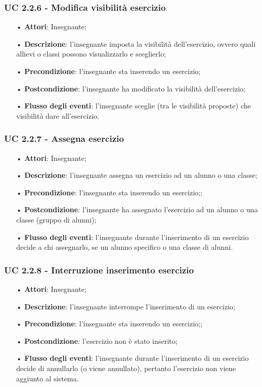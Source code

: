 \subsubsection{UC 2.2.6 - Modifica visibilità esercizio}
\begin{itemize}
	\item[•] \textbf{Attori}: Insegnante;
	\item[•] \textbf{Descrizione}: l'insegnante imposta la visibilità dell'esercizio, ovvero quali allievi o classi possono visualizzarlo e sceglierlo;
	\item[•] \textbf{Precondizione}: l'insegnante sta inserendo un esercizio;
	\item[•] \textbf{Postcondizione}: l'insegnante ha modificato la visibilità dell'esercizio;
	\item[•] \textbf{Flusso degli eventi}: l'insegnante sceglie (tra le visibilità proposte) che visibilità dare all'esercizio.
\end{itemize}


\subsubsection{UC 2.2.7 - Assegna esercizio} 
\begin{itemize}
	\item[•] \textbf{Attori}: Insegnante;
	\item[•] \textbf{Descrizione}: l'insegnante assegna un esercizio ad un alunno o una classe;
	\item[•] \textbf{Precondizione}: l'insegnante sta inserendo un esercizio;;
	\item[•] \textbf{Postcondizione}: l'insegnante ha assegnato l'esercizio ad un alunno o una classe (gruppo di alunni);
	\item[•] \textbf{Flusso degli eventi}: l'insegnante durante l'inserimento di un esercizio decide a chi assegnarlo, se un alunno specifico o una classe di alunni.
\end{itemize}

\subsubsection{UC 2.2.8 - Interruzione inserimento esercizio}
\begin{itemize}
	\item[•] \textbf{Attori}: Insegnante;
	\item[•] \textbf{Descrizione}: l'insegnante interrompe l'inserimento di un esercizio;
	\item[•] \textbf{Precondizione}: l'insegnante sta inserendo un esercizio;;
	\item[•] \textbf{Postcondizione}: l'esercizio non è stato inserito;
	\item[•] \textbf{Flusso degli eventi}: l'insegnante durante l'inserimento di un esercizio decide di annullarlo (o viene annullato), pertanto l'esercizio non viene aggiunto al sistema.
\end{itemize}

